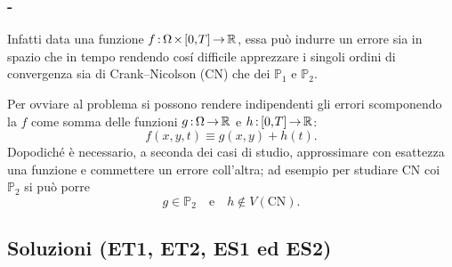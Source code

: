 \documentclass[11pt]{beamer}
\newcommand{\SpaziaturaMate}[3]{
    \setlength{\thinmuskip}{#1mu}
    \setlength{\medmuskip}{#2mu}
    \setlength{\thickmuskip}{#3mu}
}
\begin{document}
            \begin{frame}\frametitle{\titoloSez{} - \insertsubsection{}}
                Infatti data una funzione $\SpaziaturaMate{1}{2}{3}f:\Omega\times[0,T]\to\mathbb R$, essa può indurre un errore sia in spazio che in tempo rendendo cosí difficile apprezzare i singoli ordini di convergenza sia di Crank–Nicolson (CN) che dei $\mathbb P_1$ e $\mathbb P_2$.
                
                Per ovviare al problema si possono rendere indipendenti gli errori scomponendo la $f$ come somma delle funzioni $\SpaziaturaMate{1}{2}{3}g:\Omega\to\mathbb R$ e $\SpaziaturaMate{1}{2}{3}h:[0,T]\to\mathbb R$:
                \begin{equation*}
                    f(x,y,t)\equiv g(x,y)+h(t).
                \end{equation*}
                Dopodiché è necessario, a seconda dei casi di studio, approssimare con esattezza una funzione e commettere un errore coll'altra; ad esempio per studiare CN coi $\mathbb P_2$ si può porre
                \begin{equation*}
                    g\in\mathbb P_2\quad
                    \text{e}\quad
                    h\notin V(\text{CN}).
                \end{equation*}
            \end{frame}

        \subsection{Soluzioni (ET1, ET2, ES1 ed ES2)}
\end{document}
